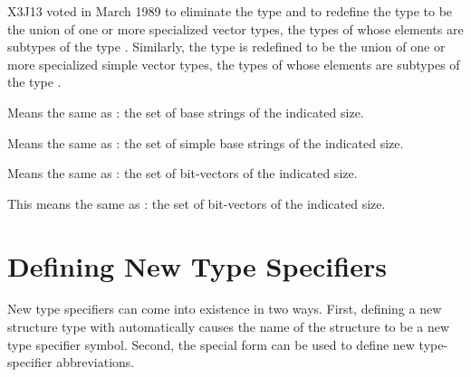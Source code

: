 \begin{newer}
X3J13 voted in March 1989 
to eliminate the type  and to redefine the type
 to be the union of one or more specialized vector
types, the types of whose elements are subtypes of the type .
Similarly, the type
 is redefined to be the union of one or more specialized
simple vector
types, the types of whose elements are subtypes of the type .

\begin{flushdesc}
\item[\cd{(base-string {\it size})}]
Means the same as
: the set of base
strings of the indicated size.


\item[\cd{(simple-base-string {\it size})}]
Means the same
as : the set of simple base
strings of the indicated size.
\end{flushdesc}
\end{newer}

\begin{flushdesc}
\item[\cd{(bit-vector {\it size})}]
Means the same as :
the set of bit-vectors of the indicated size.

\item[\cd{(simple-bit-vector {\it size})}]
This means the same as
: the set of bit-vectors of
the indicated size.
\end{flushdesc}

\section{Defining New Type Specifiers}

New type specifiers can come into existence in two ways.
First, defining a new structure type with  automatically
causes the name of the structure to be a new type specifier symbol.
Second, the  special form can be used to define new type-specifier
abbreviations.


